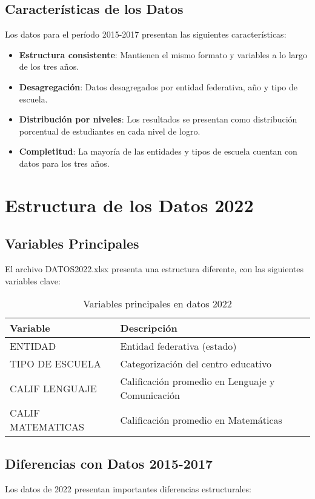 \subsection{Características de los Datos}
Los datos para el período 2015-2017 presentan las siguientes características:

\begin{itemize}
    \item \textbf{Estructura consistente}: Mantienen el mismo formato y variables a lo largo de los tres años.
    \item \textbf{Desagregación}: Datos desagregados por entidad federativa, año y tipo de escuela.
    \item \textbf{Distribución por niveles}: Los resultados se presentan como distribución porcentual de estudiantes en cada nivel de logro.
    \item \textbf{Completitud}: La mayoría de las entidades y tipos de escuela cuentan con datos para los tres años.
\end{itemize}

\section{Estructura de los Datos 2022}

\subsection{Variables Principales}
El archivo DATOS2022.xlsx presenta una estructura diferente, con las siguientes variables clave:

\begin{table}[h]
\centering
\begin{tabular}{|p{4cm}|p{8cm}|}
\hline
\textbf{Variable} & \textbf{Descripción} \\
\hline
ENTIDAD & Entidad federativa (estado) \\
\hline
TIPO DE ESCUELA & Categorización del centro educativo \\
\hline
CALIF LENGUAJE & Calificación promedio en Lenguaje y Comunicación \\
\hline
CALIF MATEMATICAS & Calificación promedio en Matemáticas \\
\hline
\end{tabular}
\caption{Variables principales en datos 2022}
\label{tabla:variables2022}
\end{table}

\subsection{Diferencias con Datos 2015-2017}
Los datos de 2022 presentan importantes diferencias estructurales:

